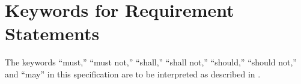 \section{Keywords for Requirement Statements}\label{keywords-for-requirement-statements}

The keywords ``must,'' ``must not,'' ``shall,'' ``shall not,''
``should,'' ``should not,'' and ``may'' in this specification are to be
interpreted as described in \cite{rfc2119}.

% 
% 
% 
% 
% 
% 
% 
% 
% 
% 
% 
% 


